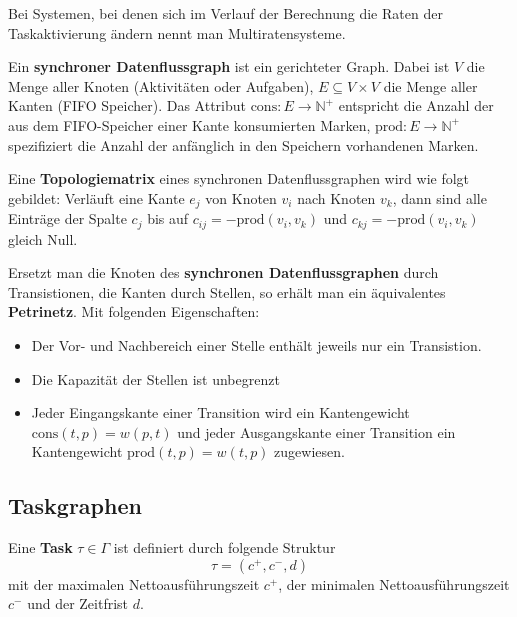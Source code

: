 Bei Systemen, bei denen sich im Verlauf der Berechnung die Raten der Taskaktivierung
ändern nennt man Multiratensysteme.

\begin{tcolorbox}
    Ein \textbf{synchroner Datenflussgraph} ist ein gerichteter Graph.
    Dabei ist $V$ die Menge aller Knoten (Aktivitäten oder Aufgaben),
    $E \subseteq V \times V$ die Menge aller Kanten (FIFO Speicher).
    Das Attribut $\text{cons}: E \to \mathbb{N}^+$ entspricht die Anzahl der
    aus dem FIFO-Speicher einer Kante konsumierten Marken, $\text{prod}: E 
    \to \mathbb{N}^+$ spezifiziert die Anzahl der anfänglich in den Speichern
    vorhandenen Marken.
\end{tcolorbox}

\begin{tcolorbox}
    Eine \textbf{Topologiematrix} eines synchronen Datenflussgraphen wird wie folgt 
    gebildet:
    Verläuft eine Kante $e_j$ von Knoten $v_i$ nach Knoten $v_k$, dann sind alle
    Einträge der Spalte $c_j$ bis auf $c_{ij}=-\text{prod}(v_i, v_k)$ und
    $c_{kj}=-\text{prod}(v_i, v_k)$ gleich Null.
\end{tcolorbox}

\begin{tcolorbox}
    Ersetzt man die Knoten des \textbf{synchronen Datenflussgraphen} durch Transistionen,
    die Kanten durch Stellen, so erhält man ein äquivalentes \textbf{Petrinetz}. Mit folgenden
    Eigenschaften:
    \begin{itemize}
        \item Der Vor- und Nachbereich einer Stelle enthält jeweils nur ein Transistion.
        \item Die Kapazität der Stellen ist unbegrenzt
        \item Jeder Eingangskante einer Transition wird ein Kantengewicht
            $\text{cons}(t,p) = w(p,t)$ und jeder Ausgangskante einer Transition
            ein Kantengewicht $\text{prod}(t,p) = w(t,p)$ zugewiesen.
    \end{itemize}
\end{tcolorbox}

\subsection{Taskgraphen}
\begin{tcolorbox}
    Eine \textbf{Task} $\tau \in \Gamma$ ist definiert durch folgende Struktur
    \begin{equation}
        \tau = (c^+, c^-, d)
    \end{equation}
    mit der maximalen Nettoausführungszeit $c^+$, der minimalen Nettoausführungszeit
    $c^-$ und der Zeitfrist $d$.
\end{tcolorbox}

